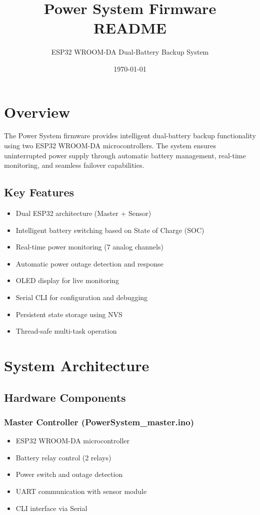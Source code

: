 \documentclass[11pt,a4paper]{article}
\title{\Huge\textbf{Power System Firmware}\\\Large README}
\author{ESP32 WROOM-DA Dual-Battery Backup System}
\date{\today}
\begin{document}
\maketitle
\newpage

\tableofcontents
\newpage

\section{Overview}

The Power System firmware provides intelligent dual-battery backup functionality using two ESP32 WROOM-DA microcontrollers. The system ensures uninterrupted power supply through automatic battery management, real-time monitoring, and seamless failover capabilities.

\subsection{Key Features}
\begin{itemize}
    \item Dual ESP32 architecture (Master + Sensor)
    \item Intelligent battery switching based on State of Charge (SOC)
    \item Real-time power monitoring (7 analog channels)
    \item Automatic power outage detection and response
    \item OLED display for live monitoring
    \item Serial CLI for configuration and debugging
    \item Persistent state storage using NVS
    \item Thread-safe multi-task operation
\end{itemize}

\section{System Architecture}

\subsection{Hardware Components}

\subsubsection{Master Controller (PowerSystem\_master.ino)}
\begin{itemize}
    \item ESP32 WROOM-DA microcontroller
    \item Battery relay control (2 relays)
    \item Power switch and outage detection
    \item UART communication with sensor module
    \item CLI interface via Serial
\end{itemize}
\end{document}
